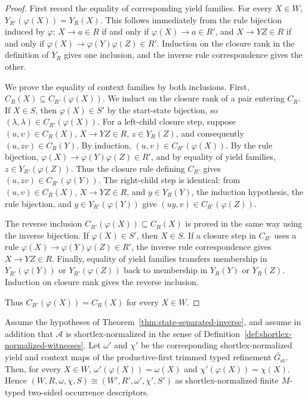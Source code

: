 \documentclass[sub]{jalc}
\begin{document}
\begin{proof}
First record the equality of corresponding yield families. For every \(X\in W\), \(Y_{R'}(\varphi(X))=Y_R(X)\). This follows immediately from the rule bijection induced by \(\varphi\): \(X\to a\in R\) if and only if \(\varphi(X)\to a\in R'\), and \(X\to YZ\in R\) if and only if \(\varphi(X)\to\varphi(Y)\varphi(Z)\in R'\). Induction on the closure rank in the definition of \(Y_R\) gives one inclusion, and the inverse rule correspondence gives the other.

We prove the equality of context families by both inclusions. First, \(C_R(X)\subseteq C_{R'}(\varphi(X))\). We induct on the closure rank of a pair entering \(C_R\). If \(X\in S\), then \(\varphi(X)\in S'\) by the start-state bijection, so \((\lambda,\lambda)\in C_{R'}(\varphi(X))\). For a left-child closure step, suppose \((u,v)\in C_R(X)\), \(X\to YZ\in R\), \(z\in Y_R(Z)\), and consequently \((u,zv)\in C_R(Y)\). By induction, \((u,v)\in C_{R'}(\varphi(X))\). By the rule bijection, \(\varphi(X)\to\varphi(Y)\varphi(Z)\in R'\), and by equality of yield families, \(z\in Y_{R'}(\varphi(Z))\). Thus the closure rule defining \(C_{R'}\) gives \((u,zv)\in C_{R'}(\varphi(Y))\). The right-child step is identical: from \((u,v)\in C_R(X)\), \(X\to YZ\in R\), and \(y\in Y_R(Y)\), the induction hypothesis, the rule bijection, and \(y\in Y_{R'}(\varphi(Y))\) give \((uy,v)\in C_{R'}(\varphi(Z))\).

The reverse inclusion \(C_{R'}(\varphi(X))\subseteq C_R(X)\) is proved in the same way using the inverse bijection. If \(\varphi(X)\in S'\), then \(X\in S\). If a closure step in \(C_{R'}\) uses a rule \(\varphi(X)\to\varphi(Y)\varphi(Z)\in R'\), the inverse rule correspondence gives \(X\to YZ\in R\). Finally, equality of yield families transfers membership in \(Y_{R'}(\varphi(Y))\) or \(Y_{R'}(\varphi(Z))\) back to membership in \(Y_R(Y)\) or \(Y_R(Z)\). Induction on closure rank gives the reverse inclusion.

Thus \(C_{R'}(\varphi(X))=C_R(X)\) for every \(X\in W\).
\end{proof}

\begin{corollary}
\label{cor:shortlex-normalized-reextraction}
Assume the hypotheses of Theorem~\ref{thm:state-separated-inverse}, and assume in addition that \(\mathcal A\) is shortlex-normalized in the sense of Definition~\ref{def:shortlex-normalized-witnesses}. Let \(\omega'\) and \(\chi'\) be the corresponding shortlex-normalized yield and context maps of the productive-first trimmed typed refinement \(\widetilde{G_{\mathrm{st}}}\). Then, for every \(X\in W\), \(\omega'(\varphi(X))=\omega(X)\) and \(\chi'(\varphi(X))=\chi(X)\). Hence \((W,R,\omega,\chi,S)\cong(W',R',\omega',\chi',S')\) as shortlex-normalized finite \(M\)-typed two-sided occurrence descriptors.
\end{corollary}
\end{document}
